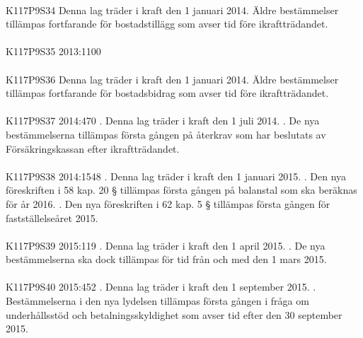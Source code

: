 \documentclass[a4paper,notitlepage,openany,10pt]{book}
\begin{document}
\paragraph*{}
{\tiny K117P9S34}
Denna lag träder i kraft den 1 januari 2014. Äldre bestämmelser tillämpas fortfarande för bostadstillägg som avser tid före ikraftträdandet.
\paragraph*{}
{\tiny K117P9S35}
2013:1100
\paragraph*{}
{\tiny K117P9S36}
Denna lag träder i kraft den 1 januari 2014. Äldre bestämmelser tillämpas fortfarande för bostadsbidrag som avser tid före ikraftträdandet.
\paragraph*{}
{\tiny K117P9S37}
2014:470
. Denna lag träder i kraft den 1 juli 2014.
. De nya bestämmelserna tillämpas första gången på återkrav som har beslutats av Försäkringskassan efter ikraftträdandet.
\paragraph*{}
{\tiny K117P9S38}
2014:1548
. Denna lag träder i kraft den 1 januari 2015.
. Den nya föreskriften i 58 kap. 20 § tillämpas första gången på balanstal som ska beräknas för år 2016.
. Den nya föreskriften i 62 kap. 5 § tillämpas första gången för fastställelseåret 2015.
\paragraph*{}
{\tiny K117P9S39}
2015:119
. Denna lag träder i kraft den 1 april 2015.
. De nya bestämmelserna ska dock tillämpas för tid från och med den 1 mars 2015.
\paragraph*{}
{\tiny K117P9S40}
2015:452
. Denna lag träder i kraft den 1 september 2015.
. Bestämmelserna i den nya lydelsen tillämpas första gången i fråga om underhållsstöd och betalningsskyldighet som avser tid efter den 30 september 2015.
\end{document}
